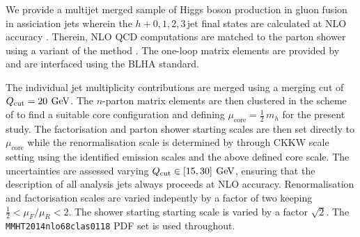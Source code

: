 \subsubsection{\hjetscompSherpa \hjetscompMEPSatNLO}
\label{sec:hjetscomp:tools:mc:sherpa}

We provide a multijet merged sample of Higgs boson production in 
gluon fusion in assiciation jets wherein the $h+0,1,2,3\,\text{jet}$ 
final states are calculated at NLO accuracy \cite{Gleisberg:2008ta,
  Hoeche:2012yf,Gehrmann:2012yg,Hoeche:2014lxa}. Therein, NLO QCD 
computations are matched to the parton shower using a variant of the 
\hjetscompSMCatNLO method \cite{Hoeche:2011fd,Hoeche:2012ft,Hoche:2012wh}.
The one-loop matrix elements are provided by \hjetscompGoSam \cite{Cullen:2011ac,
  Cullen:2013saa,Greiner:2015jha} and are interfaced using the BLHA 
\cite{Alioli:2013nda} standard.

The individual jet multiplicity contributions are merged using a merging 
cut of $Q_\text{cut}=20\,\text{\:GeV}$. The $n$-parton matrix elements are then 
clustered in the scheme of \cite{Hoeche:2009rj,Hoeche:2012yf,Gehrmann:2012yg} 
to find a suitable core configuration and defining $\mu_\text{core}
=\tfrac{1}{2}\,m_h$ for the present study. The factorisation 
and parton shower starting scales are then set directly to 
$\mu_\text{core}$ while the renormalisation scale is determined by 
through CKKW scale setting using the identified emission scales and 
the above defined core scale.
The uncertainties are assessed varying $Q_\text{cut}\in[15,30]\,\text{\:GeV}$, 
ensuring that the description of all analysis jets always proceeds 
at NLO accuracy. Renormalisation and factorisation scales are varied 
indepently by a factor of two keeping $\tfrac{1}{2} < \mu_F/\mu_R < 2$. 
The shower starting starting scale is varied by a factor $\sqrt{2}$. 
The \texttt{MMHT2014nlo68clas0118} PDF set \cite{Harland-Lang:2014zoa} 
is used throughout.

